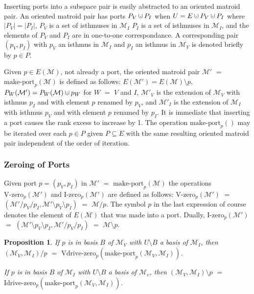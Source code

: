 \documentclass{amsproc-sunycstr}
\theoremstyle{plain}
\newtheorem{proposition}{Proposition}
\theoremstyle{definition}
\theoremstyle{remark}
\newcommand{\dunion}
{\mbox{\hbox{\hskip4pt$\cdot$\hskip-4.62pt$\cup$\hskip2pt}}}
\begin{document}

Inserting ports into a subspace pair is easily
abstracted to an oriented matroid pair.  An oriented matroid pair has ports
$P_V\dunion P_I$
when $U=E\dunion P_V\dunion P_I$ where $|P_V|=|P_I|$, $P_V$ is a set of
isthmuses in $\mathcal{M}_I$  $P_I$ is a set of isthmuses in
$\mathcal{M}_I$, and the elements of $P_V$ and $P_I$ are in one-to-one
correspondance.  A corresponding pair $(p_V,p_I)$ with
$p_V$ an isthmus in $\mathcal{M}_I$ and $p_I$ an isthmus 
in $\mathcal{M}_V$
is denoted briefly by $p\in P$.

Given $p\in E(\mathcal{M})$, not already a port, the oriented matroid
pair $\mathcal{M}'$ $=$ $\mbox{make-port}_p(\mathcal{M})$ is defined as
follows:  $E(\mathcal{M}')=E(\mathcal{M})\setminus p$,
$P_W(\mathcal{M}')=P_W(\mathcal{M})\dunion p_W$ for $W$ $=$ $V$ and $I$,
$\mathcal{M}'_V$ is the extension of $\mathcal{M}_V$ with 
isthmus $p_I$ and with element $p$ renamed by $p_V$, and 
$\mathcal{M}'_I$ is the extension of $\mathcal{M}_I$ with 
isthmus $p_V$ and with element $p$ renamed by $p_I$.
It is immediate that inserting a port causes the rank excess to increase
by 1.  The operation $\mbox{make-port}_p()$ may be iterated over each
$p\in P$  given $P\subseteq E$ with the same resulting
oriented matroid pair independent of the order of iteration.



\subsubsection{Zeroing of Ports}

Given port $p=(p_V,p_I)$ in 
$\mathcal{M}'$ $=$ $\mbox{make-port}_p(\mathcal{M})$ the operations
$\mbox{V-zero}_p(\mathcal{M}')$ and
$\mbox{I-zero}_p(\mathcal{M}')$ are defined as follows:
$\mbox{V-zero}_p(\mathcal{M}')$ $=$ 
$(\mathcal{M}'/p_V/p_I,\mathcal{M}'\setminus p_V \setminus p_I)$
$=$ $\mathcal{M}/p$.  The symbol $p$ in the last expression 
of course denotes the element of $E(\mathcal{M})$ that was made into a
port.  Dually,
$\mbox{I-zero}_p(\mathcal{M}')$ $=$ 
$(\mathcal{M}'\setminus p_V \setminus p_I,\mathcal{M}'/p_V/p_I)$
$=$ $\mathcal{M}\setminus p$. 

\begin{proposition}
If $p$ is in basis $B$ of $\mathcal{M}_V$ with 
$U\setminus B$ a basis of 
$\mathcal{M}_I$, then
$(\mathcal{M}_V,\mathcal{M}_I)/ p$ $=$
$\mbox{Vdrive-zero}_p(\mbox{make-port}_p(\mathcal{M}_V,\mathcal{M}_I))$.

If $p$ is in basis $B$ of $\mathcal{M}_I$ with 
$U\setminus B$ a basis of 
$\mathcal{M}_v$, then
$(\mathcal{M}_V,\mathcal{M}_I)\setminus p$ $=$
$\mbox{Idrive-zero}_p(\mbox{make-port}_p(\mathcal{M}_V,\mathcal{M}_I))$.
\end{proposition}
\end{document}
